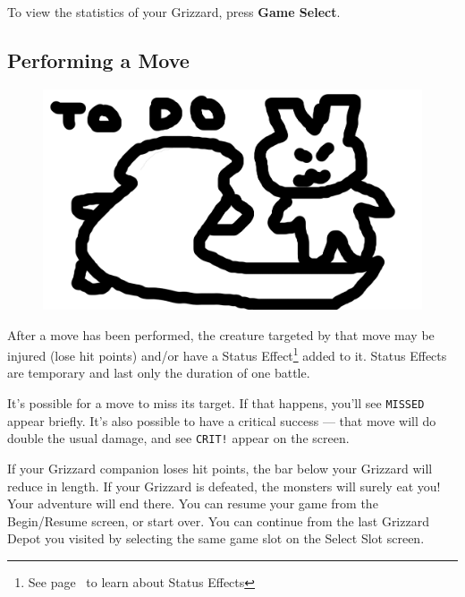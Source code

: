 \documentclass[10pt,twocolumn,openany,article]{memoir}
\begin{document}
To view the statistics of your Grizzard, press \textbf{Game Select}.

\subsection{Performing a Move}

\begin{figure}[b]
  \begin{center}
    \includegraphics[width=2\columnwidth,height=\columnwidth]{../Manual/GrizzardCombat.png}
  \end{center}
\end{figure}

After a move has been performed,  the creature targeted by that move may
be injured  (lose hit points)  and/or have a  Status Effect\footnote{See
  page~\pageref{sec:StatusEffects} to learn  about Status Effects} added
to  it. Status  Effects  are temporary  and last  only  the duration  of
one battle.

It's possible for a move to miss its target. If that happens, you'll see
\texttt{MISSED} appear  briefly. It's also  possible to have  a critical
success  ---  that  move  will  do double  the  usual  damage,  and  see
\texttt{CRIT!} appear on the screen.

If your Grizzard companion loses hit points, the bar below your Grizzard
will reduce in  length. If your Grizzard is defeated,  the monsters will
surely eat you! Your adventure will end there. \ifdefined\NOSAVE You can
resume your game from the Begin/Resume  screen, or start over. \else You
can continue from  the last Grizzard Depot you visited  by selecting the
same game slot on the Select Slot screen. \fi
\end{document}
